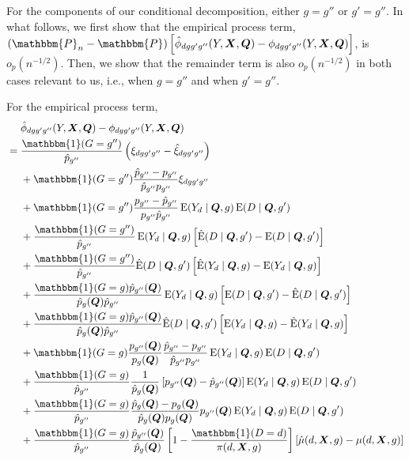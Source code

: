 \documentclass[12pt,a4paper]{article}
\newcommand{\E}{\operatorname{E}}
\def\X{{\boldsymbol X}}
\def\Q{{\boldsymbol Q}}
\def\one{\mathbbm{1}}
\def\P{\mathbbm{P}}
\begin{document}
For the components of our conditional decomposition, either $g=g''$ or $g'=g''$. In what follows, we first show that the empirical process term, $(\P_n-\P) \left[ \hat{\phi}_{dgg'g''}(Y,\X,\Q)- \phi_{dgg'g''}(Y,\X,\Q) \right]$, is $o_p(n^{-1/2})$. Then, we show that the remainder term is also $o_p(n^{-1/2})$ in both cases relevant to us, i.e., when $g=g''$ and when $g'=g''$.

For the empirical process term, 
\begin{align*}
    &\phantom{{}={}} \hat{\phi}_{dgg'g''}(Y,\X,\Q)-\phi_{dgg'g''}(Y,\X,\Q) \\
    &= \frac{\one(G=g'')}{\hat{p}_{g''}}\left(\xi_{dgg'g''}-\hat{\xi}_{dgg'g''}\right) \\
    &\phantom{{}={}} + \one(G=g'')\frac{\hat{p}_{g''}-p_{g''}}{\hat{p}_{g''}p_{g''}} \xi_{dgg'g''} \\
    &\phantom{{}={}} + \one(G=g'')\frac{p_{g''}-\hat{p}_{g''}}{p_{g''}\hat{p}_{g''}}\E(Y_d \mid \Q,g)\E(D \mid \Q,g') \\
    &\phantom{{}={}} + \frac{\one(G=g'')}{\hat{p}_{g''}} \E(Y_d \mid \Q,g)\left[ \hat{\E}(D \mid \Q,g')-\E(D \mid \Q,g')\right] \\
    &\phantom{{}={}} + \frac{\one(G=g'')}{\hat{p}_{g''}} \hat{\E}(D \mid \Q,g')\left[\hat{\E}(Y_d \mid \Q,g)-\E(Y_d \mid \Q,g) \right] \\
    &\phantom{{}={}} + \frac{\one(G=g) \hat{p}_{g''}(\Q)}{\hat{p}_{g}(\Q) \hat{p}_{g''}} \E(Y_d \mid \Q,g) \left[ \E(D \mid \Q,g')-\hat{\E}(D \mid \Q,g') \right] \\
    &\phantom{{}={}} + \frac{\one(G=g) \hat{p}_{g''}(\Q)}{\hat{p}_{g}(\Q) \hat{p}_{g''}} \hat{\E}(D \mid \Q,g')\left[\E(Y_d \mid \Q,g)-\hat{\E}(Y_d \mid \Q,g) \right] \\
    &\phantom{{}={}} + \one(G=g)\frac{p_{g''}(\Q)}{p_g(\Q)}\frac{\hat{p}_{g''}-p_{g''}}{\hat{p}_{g''}p_{g''}} \E(Y_d \mid \Q,g)\E(D \mid \Q,g') \\
    &\phantom{{}={}} + \frac{\one(G=g)}{\hat{p}_{g''}}\frac{1}{\hat{p}_g(\Q)}\left[p_{g''}(\Q)-\hat{p}_{g''}(\Q) \right] \E(Y_d \mid \Q,g)\E(D \mid \Q,g') \\
    &\phantom{{}={}} + \frac{\one(G=g)}{\hat{p}_{g''}} \frac{\hat{p}_g(\Q)-p_g(\Q)}{\hat{p}_g(\Q)p_g(\Q)} p_{g''}(\Q)\E(Y_d \mid \Q,g)\E(D \mid \Q,g') \\
    &\phantom{{}={}} + \frac{\one(G=g)}{\hat{p}_{g''}}\frac{\hat{p}_{g''}(\Q)}{\hat{p}_{g}(\Q)} \left[ 1-\frac{\one(D=d)}{\pi(d,\X,g)} \right] \left[\hat{\mu}(d,\X,g)-\mu(d,\X,g)\right] \\

\end{align*}
\end{document}
